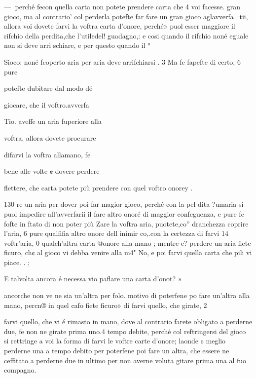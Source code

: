 \documentclass[12pt,a6paper]{article}
\begin{document}
—
perché fecon quella carta non
potete prendere carta che 4 voi
facesse. gran gioco, ma al contrario’ col perderla potefte far
fare un gran gioco aglavverfa~
tii, allora voi dovete farvi la
voftra carta d’onore, perché»
puol esser maggiore il rifchio
della perdita,che l'utiledel! guadagno,: e cosi quando il rifchio
noné eguale non si deve arri
schiare, e per questo quando il °

Sioco: noné fcoperto aria per
aria deve arrifchiarsi . 3
Ma fe fapefte di certo, 6 pure

potefte dubitare dal modo dé

giocare, che il voftro.avverfa~

Tio. aveffe un aria fuperiore alla

voftra, allora dovete procurare

difarvi la voftra allamano, fe

bene alle volte ¢ dovere perdere

   

flettere, che carta potete più
prendere con quel voftro onorey .
 

 

 

 

 

 

 

130
re un aria per dover poi far magior gioco, perché con la pel
dita ?umaria si puol impedire
all’avverfarii il fare altro onoré
di maggior confeguenza, e pure
fe fofte in ftato di non poter più
Zare la voftra aria, puotete,co”
dranchezza coprire l’aria, 6 pure
qualfifia altro onore dell inimir
co,.con la certezza di farvi 14
voftr’aria, 0 qualch’altra carta
@onore alla mano ; mentre-c?
perdere un aria fiete ficuro, ch¢
al gioco vi debba venire alla m4"
No, e poi farvi quella carta che
pili vi piace. . ;

E talvolta ancora é necessa
vio paflare una carta d’onot? »

ancorche non ve ne sia un’altra
per folo. motivo di poterfene po
fare un’altra alla mano, percn®
in quel cafo fiete ficuro» di
farvi quello, che girate, 2
 

 

farvi quello, che vi é rimasto in
mano, dove al contrario farete
obligato a perderne due, fe non
ne girate prima uno.4 tempo debite, perché col reftringersi del
gioco si rettringe a voi la forma
di farvi le voftre carte d’onore;
laonde ¢ meglio perderne una
a tempo debito per poterfene
poi fare un altra, che essere ne
ceffitato a perderne due in ultimo per non averne voluta gitare prima una al fuo compagno.
\end{document}
